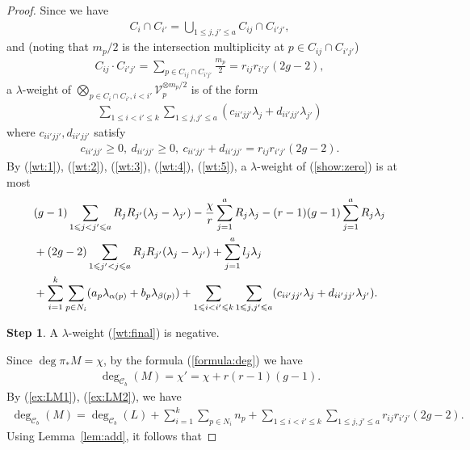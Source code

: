 \documentclass[11pt,oneside,a4paper,mathscr]{amsart}
\theoremstyle{definition}
\newtheorem{sstep}{Step}
\renewcommand{\leq}{\leqslant}
\renewcommand{\geq}{\geqslant}
\newcommand{\cC}{\mathcal{C}}
\begin{document}
\begin{proof}
Since we have 
\begin{align*}
    C_{i} \cap C_{i'}=\bigcup_{1\leq j, j' \leq a} C_{ij} \cap C_{i'j'},
\end{align*}
and (noting that $m_p/2$ is the intersection multiplicity at $p\in C_{ij} \cap C_{i' j'}$)
\begin{align*}
    C_{ij} \cdot C_{i' j'}=\sum_{p\in C_{ij} \cap C_{i' j'}}\frac{m_p}{2}=r_{ij} r_{i' j'}(2g-2), 
\end{align*}
a $\lambda$-weight of $\bigotimes_{p\in C_i \cap C_{i'}, i<i'}\mathcal{V}_p^{\otimes m_p/2}$
is of the form 
\begin{align}\label{wt:5}
    \sum_{1\leq i<i' \leq k} \sum_{1\leq j, j' \leq a}(c_{i i' j j'}\lambda_j+
    d_{i i' j j'}\lambda_{j'})
\end{align}
where $c_{i i' j j'},  d_{i i' j j'}$ satisfy 
\begin{align}\label{cond:bc}
    c_{i i' j j'}\geq 0, \ d_{i i' j j'} \geq 0, \  c_{i i' j j'}+d_{i i' j j'}=r_{ij} r_{i' j'}(2g-2).
\end{align}
By (\ref{wt:1}), (\ref{wt:2}), (\ref{wt:3}), (\ref{wt:4}), (\ref{wt:5}), 
a $\lambda$-weight of (\ref{show:zero}) is at most 
\begin{align}\label{wt:final}
&(g-1)\sum_{1\leq j<j' \leq a}R_j R_{j'}(\lambda_j-\lambda_{j'})-\frac{\chi}{r}\sum_{j=1}^a R_j \lambda_j
 -(r-1)(g-1)\sum_{j=1}^a R_j \lambda_j 
\\
&\notag +(2g-2)\sum_{1\leq j'<j \leq a}R_j R_{j'}(\lambda_j-\lambda_{j'})
+\sum_{j=1}^a l_j \lambda_j \\
&\notag + \sum_{i=1}^k \sum_{p\in N_i} (a_p\lambda_{\alpha(p)}+b_p\lambda_{\beta(p)})
+ \sum_{1\leq i<i' \leq k} \sum_{1\leq j, j' \leq a}(c_{i i' j j'}\lambda_j+
    d_{i i' j j'}\lambda_{j'}).
\end{align}
\begin{sstep}
A $\lambda$-weight (\ref{wt:final}) is negative. 
\end{sstep}
Since $\deg \pi_{*}M=\chi$, by the formula (\ref{formula:deg}) we have 
\begin{align*}
    \deg_{\cC_b}(M)=\chi'=\chi+r(r-1)(g-1).
\end{align*}
By (\ref{ex:LM1}), (\ref{ex:LM2}), we have 
\begin{align*}
    \deg_{\cC_b}(M)
    =\deg_{\cC_b}(L)+\sum_{i=1}^k \sum_{p\in N_i}n_p
    +\sum_{1\leq i<i'\leq k}\sum_{1\leq j, j' \leq a}r_{ij} r_{i'j'}(2g-2).
\end{align*}
Using Lemma~\ref{lem:add}, it follows that 

\end{proof}
\end{document}
